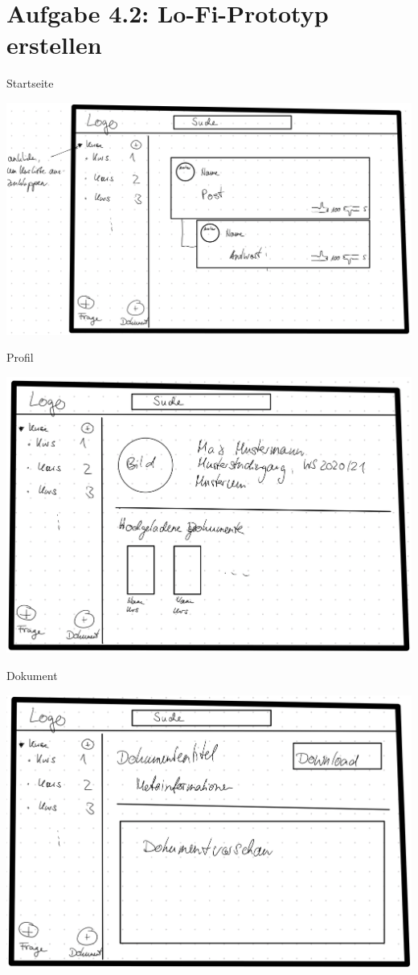\documentclass{article}
\begin{document}
	\section*{Aufgabe 4.2: Lo-Fi-Prototyp erstellen}
	 Startseite
	 \begin{center}
	 	\includegraphics[scale=0.15]{startseite.jpeg}
	 \end{center}
 	\pagebreak
 	Profil
 	\begin{center}
 		\includegraphics[scale=0.15]{profil.jpeg}
	 \end{center}
 	Dokument
 	\begin{center}
 		\includegraphics[scale=0.15]{dokument.jpeg}
 	\end{center}
 
\end{document}
